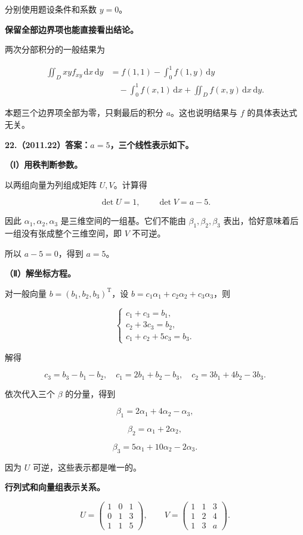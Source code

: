 \documentclass[UTF8,11pt,fontset=windows]{ctexart}
\begin{document}
分别使用题设条件和系数 $y=0$。

\textbf{保留全部边界项也能直接看出结论。}

两次分部积分的一般结果为

$$
\begin{aligned}
\iint_Dxy f_{xy}\,\mathrm dx\,\mathrm dy
&=f(1,1)-\int_0^1f(1,y)\,\mathrm dy\\
&\quad-\int_0^1f(x,1)\,\mathrm dx+\iint_Df(x,y)\,\mathrm dx\,\mathrm dy.
\end{aligned}
$$

本题三个边界项全部为零，只剩最后的积分 $a$。这也说明结果与 $f$ 的具体表达式无关。

\clearpage

\textbf{22.（2011.22）答案：$a=5$，三个线性表示如下。}

\textbf{（Ⅰ）用秩判断参数。}

以两组向量为列组成矩阵 $U,V$。计算得

$$
\det U=1,\qquad \det V=a-5.
$$

因此 $\alpha_1,\alpha_2,\alpha_3$ 是三维空间的一组基。它们不能由 $\beta_1,\beta_2,\beta_3$ 表出，恰好意味着后一组没有张成整个三维空间，即 $V$ 不可逆。

所以 $a-5=0$，得到 $a=5$。

\textbf{（Ⅱ）解坐标方程。}

对一般向量 $b=(b_1,b_2,b_3)^{\mathrm T}$，设 $b=c_1\alpha_1+c_2\alpha_2+c_3\alpha_3$，则

$$
\begin{cases}
c_1+c_3=b_1,\\c_2+3c_3=b_2,\\c_1+c_2+5c_3=b_3.
\end{cases}
$$

解得

$$
c_3=b_3-b_1-b_2,\quad
c_1=2b_1+b_2-b_3,\quad
c_2=3b_1+4b_2-3b_3.
$$

依次代入三个 $\beta$ 的分量，得到

$$
\beta_1=2\alpha_1+4\alpha_2-\alpha_3,
$$

$$
\beta_2=\alpha_1+2\alpha_2,
$$

$$
\beta_3=5\alpha_1+10\alpha_2-2\alpha_3.
$$

因为 $U$ 可逆，这些表示都是唯一的。

\textbf{行列式和向量组表示关系。}

$$
U=\begin{pmatrix}1&0&1\\0&1&3\\1&1&5\end{pmatrix},
\qquad V=\begin{pmatrix}1&1&3\\1&2&4\\1&3&a\end{pmatrix}.
$$
\end{document}
